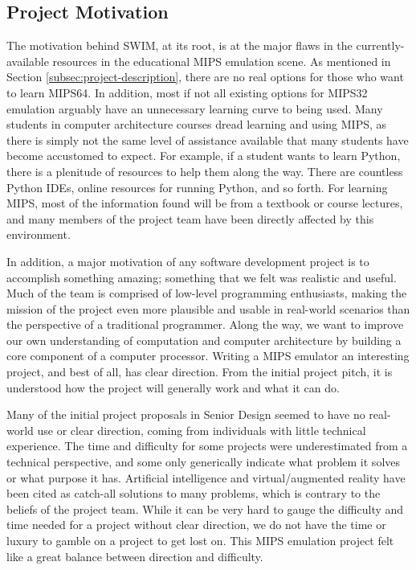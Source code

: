 \documentclass[
    paper=letter,
    parskip=half,
    fontsize=12pt,
    titlepage=firstiscover,
    toc=bibliography,
    numbers=endperiod
]{scrartcl}
\begin{document}
\subsection{Project Motivation}

The motivation behind SWIM, at its root, is at the major flaws in the
currently-available resources in the educational MIPS emulation scene.
As mentioned in Section \ref{subsec:project-description}, there are no
real options for those who want to learn MIPS64. In addition, most if
not all existing options for MIPS32 emulation arguably have an
unnecessary learning curve to being used. Many students in computer
architecture courses dread learning and using MIPS, as there is simply
not the same level of assistance available that many students have
become accustomed to expect. For example, if a student wants to learn
Python, there is a plenitude of resources to help them along the way.
There are countless Python IDEs, online resources for running Python,
and so forth. For learning MIPS, most of the information found will be
from a textbook or course lectures, and many members of the project team
have been directly affected by this environment.

In addition, a major motivation of any software development project is
to accomplish something amazing; something that we felt was realistic
and useful. Much of the team is comprised of low-level programming
enthusiasts, making the mission of the project even more plausible and
usable in real-world scenarios than the perspective of a traditional
programmer. Along the way, we want to improve our own understanding of
computation and computer architecture by building a core component of a
computer processor. Writing a MIPS emulator an interesting project, and
best of all, has clear direction. From the initial project pitch, it is
understood how the project will generally work and what it can do.

Many of the initial project proposals in Senior Design seemed to have no
real-world use or clear direction, coming from individuals with little
technical experience. The time and difficulty for some projects were
underestimated from a technical perspective, and some only generically
indicate what problem it solves or what purpose it has. Artificial
intelligence and virtual/augmented reality have been cited as catch-all
solutions to many problems, which is contrary to the beliefs of the
project team. While it can be very hard to gauge the difficulty and time
needed for a project without clear direction, we do not have the time or
luxury to gamble on a project to get lost on. This MIPS emulation
project felt like a great balance between direction and difficulty.
\end{document}
